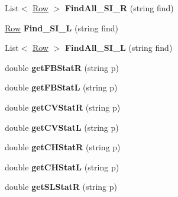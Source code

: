 \begin{DoxyCompactItemize}
\item 
List$<$ \hyperlink{class_stats_script_1_1_row}{Row} $>$ {\bfseries Find\+All\+\_\+\+S\+I\+\_\+R} (string find)\hypertarget{class_stats_script_ad196d7f8cd2d3edf5facc3b2e15bdcfa}{}\label{class_stats_script_ad196d7f8cd2d3edf5facc3b2e15bdcfa}

\item 
\hyperlink{class_stats_script_1_1_row}{Row} {\bfseries Find\+\_\+\+S\+I\+\_\+L} (string find)\hypertarget{class_stats_script_a75537b60e33937832259bdc471ae530d}{}\label{class_stats_script_a75537b60e33937832259bdc471ae530d}

\item 
List$<$ \hyperlink{class_stats_script_1_1_row}{Row} $>$ {\bfseries Find\+All\+\_\+\+S\+I\+\_\+L} (string find)\hypertarget{class_stats_script_a8019586f2af59a3f3bc25a33b516c381}{}\label{class_stats_script_a8019586f2af59a3f3bc25a33b516c381}

\item 
double {\bfseries get\+F\+B\+StatR} (string p)\hypertarget{class_stats_script_a07b9ed491579e833cc8f7d0e0fdad2da}{}\label{class_stats_script_a07b9ed491579e833cc8f7d0e0fdad2da}

\item 
double {\bfseries get\+F\+B\+StatL} (string p)\hypertarget{class_stats_script_a5f7ead9f2aca8ddd0dd73fb802041097}{}\label{class_stats_script_a5f7ead9f2aca8ddd0dd73fb802041097}

\item 
double {\bfseries get\+C\+V\+StatR} (string p)\hypertarget{class_stats_script_afa2d6a58bb72608861477d67f8452ac9}{}\label{class_stats_script_afa2d6a58bb72608861477d67f8452ac9}

\item 
double {\bfseries get\+C\+V\+StatL} (string p)\hypertarget{class_stats_script_ae3ba9da1e3fe3e9765aae3a34e8e04be}{}\label{class_stats_script_ae3ba9da1e3fe3e9765aae3a34e8e04be}

\item 
double {\bfseries get\+C\+H\+StatR} (string p)\hypertarget{class_stats_script_a07e1610a7ce605002411c224e4614fbb}{}\label{class_stats_script_a07e1610a7ce605002411c224e4614fbb}

\item 
double {\bfseries get\+C\+H\+StatL} (string p)\hypertarget{class_stats_script_a4307505e92d88207dbfafc114f75a4b2}{}\label{class_stats_script_a4307505e92d88207dbfafc114f75a4b2}

\item 
double {\bfseries get\+S\+L\+StatR} (string p)\hypertarget{class_stats_script_a21f3664a222b1956aca9ac9c372ddac0}{}\label{class_stats_script_a21f3664a222b1956aca9ac9c372ddac0}


\end{DoxyCompactItemize}
